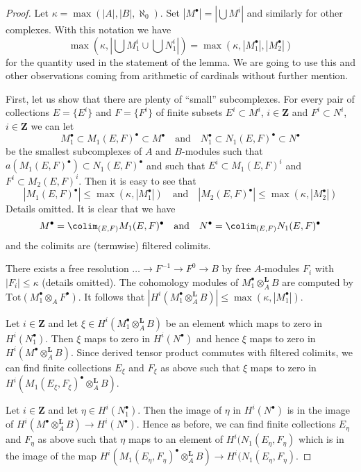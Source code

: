 \begin{proof}
Let $\kappa = \max(|A|, |B|, \aleph_0)$. Set $|M^\bullet| = |\bigcup M^i|$
and similarly for other complexes. With this notation we have
$$
\max(\kappa, |\bigcup M_1^i \cup \bigcup N_1^i|) =
\max(\kappa, |M_1^\bullet|, |M_2^\bullet|)
$$
for the quantity used in the statement of the lemma. We are going to
use this and other observations coming from arithmetic of cardinals
without further mention.

\medskip\noindent
First, let us show that there are plenty of ``small'' subcomplexes.
For every pair of collections $E = \{E^i\}$ and $F = \{F^i\}$
of finite subsets $E^i \subset M^i$, $i \in \mathbf{Z}$
and $F^i \subset N^i$, $i \in \mathbf{Z}$ we can let
$$
M_1^\bullet \subset M_1(E, F)^\bullet \subset M^\bullet
\quad\text{and}\quad
N_1^\bullet \subset N_1(E, F)^\bullet \subset N^\bullet
$$
be the smallest subcomplexes of $A$ and $B$-modules
such that $a(M_1(E, F)^\bullet) \subset N_1(E, F)^\bullet$
and such that $E^i \subset M_1(E, F)^i$ and $F^i \subset M_2(E, F)^i$.
Then it is easy to see that
$$
|M_1(E, F)^\bullet| \leq \max(\kappa, |M_1^\bullet|)
\quad\text{and}\quad
|M_2(E, F)^\bullet| \leq \max(\kappa, |M_2^\bullet|)
$$
Details omitted. It is clear that we have
$$
M^\bullet = \colim_{(E, F)} M_1(E, F)^\bullet
\quad\text{and}\quad
N^\bullet = \colim_{(E, F)} N_1(E, F)^\bullet
$$
and the colimits are (termwise) filtered colimits.

\medskip\noindent
There exists a free resolution $\ldots \to F^{-1} \to F^0 \to B$
by free $A$-modules $F_i$ with $|F_i| \leq \kappa$ (details omitted).
The cohomology modules of $M_1^\bullet \otimes_A^\mathbf{L} B$ are
computed by $\text{Tot}(M_1^\bullet \otimes_A F^\bullet)$.
It follows that
$|H^i(M_1^\bullet \otimes_A^\mathbf{L} B)| \leq \max(\kappa, |M_1^\bullet|)$.

\medskip\noindent
Let $i \in \mathbf{Z}$ and let
$\xi \in H^i(M_1^\bullet \otimes_A^\mathbf{L} B)$
be an element which maps to zero in $H^i(N_1^\bullet)$.
Then $\xi$ maps to zero in $H^i(N^\bullet)$ and hence
$\xi$ maps to zero in $H^i(M^\bullet \otimes_A^\mathbf{L} B)$.
Since derived tensor product commutes with filtered colimits,
we can find finite collections $E_\xi$ and $F_\xi$
as above such that $\xi$ maps to zero in
$H^i(M_1(E_\xi, F_\xi)^\bullet \otimes_A^\mathbf{L} B)$.

\medskip\noindent
Let $i \in \mathbf{Z}$ and let $\eta \in H^i(N_1^\bullet)$.
Then the image of $\eta$ in $H^i(N^\bullet)$ is in the image
of $H^i(M^\bullet \otimes_A^\mathbf{L} B) \to H^i(N^\bullet)$.
Hence as before, we can find finite collections $E_\eta$ and $F_\eta$
as above such that $\eta$ maps to an element of
$H^i(N_1(E_\eta, F_\eta)$ which is in the image of the map
$H^i(M_1(E_\eta, F_\eta)^\bullet \otimes_A^\mathbf{L} B) \to
H^i(N_1(E_\eta, F_\eta)$.


\end{proof}
